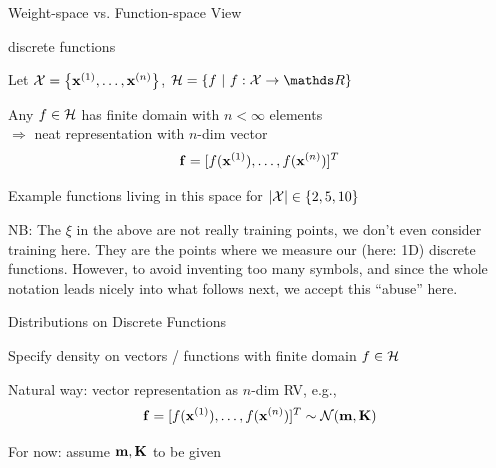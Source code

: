 \documentclass[11pt,compress,t,notes=noshow, xcolor=table]{beamer}
\begin{document}
\begin{framev}{Weight-space vs. Function-space View}
\end{framev}

\begin{framei}{discrete functions}
\item Let $\mathcal{X} = \left\{ \mathbf{x}^{(1)}, \ldots, \mathbf{x}^{(n)}\right\}$, $\Hspace = \{f ~|~ f: \Xspace \rightarrow \R\}$
\item Any $f \in \mathcal{H}$ has finite domain with $n < \infty$ elements \\$\Rightarrow$ neat representation with $n$-dim vector 
$$\mathbf{f} = [f(\mathbf{x}^{(1)}), \dots, f(\mathbf{x}^{(n)})]^T$$
\item Example functions living in this space for $|\mathcal{X}| \in \{2, 5, 10\}$
\vfill
{}

\item \footnotesize{NB: The $\xi$ in the above are not really training points, we don't even consider training here. They are the points where we measure our (here: 1D) discrete functions. However, to avoid inventing too many symbols, and since the whole notation leads nicely into what follows next, we accept this ``abuse'' here.}  

\end{framei}

\begin{framei}[sep=L]{Distributions on Discrete Functions}
\item Specify density on vectors / functions with finite domain $f \in \mathcal{H}$ 
\item Natural way: vector representation as $n$-dim RV, e.g.,
$$\mathbf{f} = [f(\mathbf{x}^{(1)}), \dots, f(\mathbf{x}^{(n)})]^T \sim \mathcal{N}(\mathbf{m}, \mathbf{K})$$
\item For now: assume $\mathbf{m}, \mathbf{K}$ to be given
\end{framei}
\end{document}
